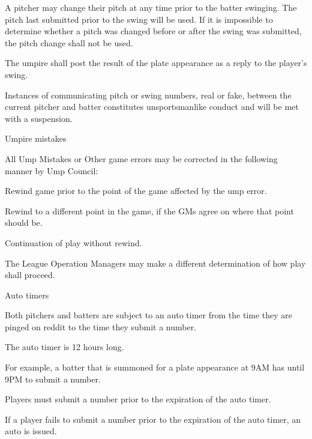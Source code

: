 \begin{deepEnumerate}
\begin{deepEnumerate}
\begin{deepEnumerate}
			\item A pitcher may change their pitch at any time prior to the batter swinging. The pitch last submitted prior to the swing will be used.
			If it is impossible to determine whether a pitch was changed before or after the swing was submitted, the pitch change shall not be used.
		\end{deepEnumerate}
		\item The umpire shall post the result of the plate appearance as a reply to the player's swing.
		\item Instances of communicating pitch or swing numbers, real or fake, 
		between the current pitcher and batter constitutes unsportsmanlike conduct and will be met with a suspension.
		\item Umpire mistakes
		\begin{deepEnumerate}
			\item All Ump Mistakes or Other game errors may be corrected in the following manner by Ump Council:
			\begin{deepEnumerate}
				\item Rewind game prior to the point of the game affected by the ump error.
				\item Rewind to a different point in the game, if the GMs agree on where that point should be.
				\item Continuation of play without rewind.
			\end{deepEnumerate}
			\item The League Operation Managers may make a different determination of how play shall proceed.
		\end{deepEnumerate}
	\end{deepEnumerate}
	\item Auto timers
	\begin{deepEnumerate}
		\item Both pitchers and batters are subject to an auto timer from the time they are pinged on reddit to the time they submit a number.
		\item The auto timer is 12 hours long.
		\begin{deepEnumerate}
			\item For example, a batter that is summoned for a plate appearance at 9AM has until 9PM to submit a number.
		\end{deepEnumerate}
		\item Players must submit a number prior to the expiration of the auto timer.
		\item If a player fails to submit a number prior to the expiration of the auto timer, an auto is issued.

\end{deepEnumerate}
\end{deepEnumerate}
